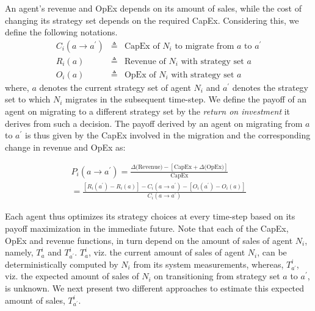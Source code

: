 \documentclass[smallextended]{svjour3}
\begin{document}
\par An agent's revenue and OpEx depends on its amount of sales, while the cost of
changing its strategy set depends on the required CapEx. Considering
this, we define the following notations.
\begin{displaymath}
\begin{array}{rcl}
C_i(a \to a^\prime) & \triangleq & \textrm{CapEx of } N_i \textrm{ to migrate from } a \textrm{ to } a^\prime  \\
R_i(a) & \triangleq & \textrm{Revenue of } N_i \textrm{ with strategy set } a\\
O_i(a) & \triangleq & \textrm{OpEx of } N_i \textrm{ with strategy set } a
\end{array}
\end{displaymath}
where, $a$ denotes the current strategy set of agent $N_i$ and $a^\prime$
denotes the strategy set to which $N_i$ migrates in the subsequent
time-step. We define the payoff of an agent on migrating to a different strategy set by the \emph{return on investment} it derives from such a decision. The payoff derived by an agent on migrating from $a$ to
$a^\prime$ is thus given by the CapEx involved in the migration and the
corresponding change in revenue and OpEx as:

\begin{multline}\label{eq:genericPayoffDef}
P_i({a \to a^\prime}) = \frac{\Delta\textrm{(Revenue)} - \left[\textrm{CapEx} + \Delta\textrm{(OpEx)}\right] }{\textrm{CapEx}}\\
=\frac{ \left[R_i(a^\prime)-R_i(a)\right] - C_i(a \to a^\prime) -\left[O_i(a^\prime)-O_i(a)\right]}{C_i(a \to a^\prime)}
\end{multline}

\par Each agent thus optimizes its strategy choices at every time-step based on
its payoff maximization in the immediate future. Note that each of the CapEx,
OpEx and revenue functions, in turn depend on the amount of sales of agent
$N_i$, namely, $T_{a}^i$ and $T_{a^\prime}^i$. $T_{a}^i$, viz. the current
amount of sales of agent $N_i$, can be deterministically computed by $N_i$ from
its system measurements, whereas, $T_{a^\prime}^i$, viz. the expected
amount of sales of $N_i$ on transitioning from strategy set $a$ to $a^\prime$,
is unknown. We next present two different approaches to estimate this expected
amount of sales, $T_{a^\prime}^i$.
\end{document}
